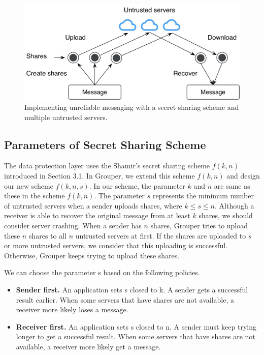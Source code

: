 \documentclass[twocolumn,10pt]{article}
\begin{document}
\begin{figure}[t]
	\centering
	\includegraphics[scale=0.42]{sync_flow}
	\caption{Implementing unreliable messaging with a secret sharing scheme and multiple untrusted servers.}
\end{figure}


\subsection{Parameters of Secret Sharing Scheme}

The data protection layer uses the Shamir's secret sharing scheme $f(k, n)$ introduced in Section 3.1.
In Grouper, we extend this scheme $f(k, n)$ and design our new scheme $ f(k, n, s)$.
In our scheme, the parameter $k$ and $n$ are same as these in the scheme $f(k, n)$. 
The  parameter $s$ represents the minimum number of untrusted servers when a sender uploads shares, where $k \leq s \leq n$.
Although a receiver is able to recover the original message from at least $k$ shares, we should consider server crashing. 
When a sender has $n$ shares, Grouper tries to upload these $n$ shares to all $n$ untrusted servers at first. 
If the shares are uploaded to $s$ or more untrusted servers, we consider that this uploading is successful.
Otherwise, Grouper keeps trying to upload these shares.

We can choose the parameter s based on the following policies.

\begin{itemize}
	\setlength{\itemsep}{1pt}
	\setlength{\parskip}{0pt}
	\setlength{\parsep}{0pt}
	\item \textbf{Sender first.} 
	An application sets s closed to k. 
	A sender gets a successful result earlier.
	When some servers that have shares are not available, a receiver more likely loses a message.
	\item \textbf{Receiver first.}
	An application sets s closed to n. 
	A sender must keep trying longer to get a successful result.
	When some servers that have shares are not available, a receiver more likely get a message.
\end{itemize}
\end{document}
